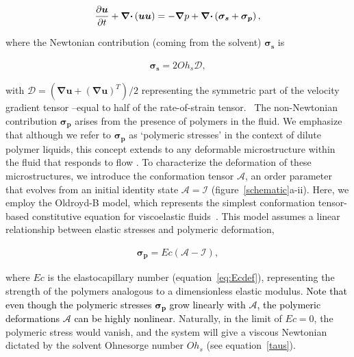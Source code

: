 \documentclass{jfm}
\newcommand{\AO}[1]{{\textcolor{black}{#1}}}
\newcommand{\oo}{\color{black} \normalfont}
\newcommand{\bb}{\color{black} \normalfont}
\begin{document}
\begin{align}
	\label{momconserve}
	\frac{\partial \boldsymbol{u}}{\partial t} + \boldsymbol{\nabla\cdot} \left(\boldsymbol{u}\boldsymbol{u}\right) =  -\boldsymbol{\nabla}p + \boldsymbol{\nabla\cdot}\left(\boldsymbol{\sigma_s}+\boldsymbol{\sigma_p}\right),
\end{align}

\noindent where the Newtonian contribution (coming from the solvent) $\boldsymbol{\sigma_s}$ is

\begin{align}
	\label{taus}
	\boldsymbol{\sigma_{s}} =  2 Oh_s \boldsymbol{\mathcal{D}},
\end{align}

\noindent with $\boldsymbol{\mathcal{D}} = \left(\boldsymbol{\nabla u} + \left( \boldsymbol{ \nabla u} \right) ^T \right)/2$ representing the symmetric part of the velocity gradient tensor\oo--equal to half of the rate-of-strain tensor.\bb\,
The non-Newtonian contribution $\boldsymbol{\sigma_{p}}$ arises from the presence of polymers in the fluid. We emphasize that although we refer to $\boldsymbol{\sigma_{p}}$ as `polymeric stresses' in the context of dilute polymer liquids, this concept extends to any deformable microstructure within the fluid that responds to flow \citep{saramito2007,snoeijer2020relationship,francca2024elasto,ari2024bursting}.
To characterize the deformation of these microstructures, we introduce the conformation tensor $\boldsymbol{\mathcal{A}}$, an order parameter that evolves from an initial identity state $\boldsymbol{\mathcal{A}} = \boldsymbol{\mathcal{I}}$ (figure~\ref{schematic}a-ii).
\oo Here, we employ the Oldroyd-B model, which represents the simplest conformation tensor-based constitutive equation for viscoelastic fluids \bb\,\citep{oldroyd1950formulation, bird1977dynamics, snoeijer2020relationship, stone2023note, boyko2024perspective}. This model assumes a linear relationship between elastic stresses and polymeric deformation,

\begin{align}
	\label{sigmap}
	\boldsymbol{\sigma_{p}} = Ec \left(\boldsymbol{\mathcal{A}} - \boldsymbol{\mathcal{I}}\right),
\end{align}

\noindent where $Ec$ is the elastocapillary number (equation~\eqref{eq:Ecdef}), representing the strength of the polymers analogous to a dimensionless elastic modulus. \AO{Note that even though the polymeric stresses $\boldsymbol{\sigma_{p}}$ grow linearly with $\boldsymbol{\mathcal{A}}$, the polymeric deformations $\boldsymbol{\mathcal{A}}$ can be highly nonlinear}. Naturally, in the limit of $Ec = 0$, the polymeric stress would vanish, and the system will give a viscous Newtonian dictated by the solvent Ohnesorge number $Oh_s$ (see equation~\eqref{taus}).
\end{document}
